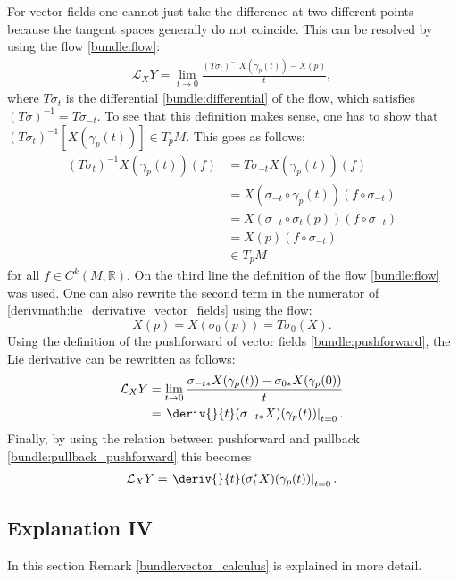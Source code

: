     For vector fields one cannot just take the difference at two different points because the tangent spaces generally do not coincide. This can be resolved by using the flow \ref{bundle:flow}:
    \begin{gather}
        \label{derivmath:lie_derivative_vector_fields}
        \mathcal{L}_XY = \lim_{t\rightarrow0}\frac{(T\sigma_t)^{-1}X(\gamma_p(t)) - X(p)}{t},
    \end{gather}
    where $T\sigma_t$ is the differential \ref{bundle:differential} of the flow, which satisfies $(T\sigma)^{-1} = T\sigma_{-t}$. To see that this definition makes sense, one has to show that $(T\sigma_t)^{-1}[X(\gamma_p(t))]\in T_pM$. This goes as follows:
    \begin{align*}
        (T\sigma_t)^{-1}X(\gamma_p(t))(f) &= T\sigma_{-t}X(\gamma_p(t))(f)\\
        &= X(\sigma_{-t}\circ\gamma_p(t))(f\circ\sigma_{-t})\\
        &= X(\sigma_{-t}\circ\sigma_t(p))(f\circ\sigma_{-t})\\
        &= X(p)(f\circ\sigma_{-t})\\
        &\in T_pM
    \end{align*}
    for all $f\in C^k(M,\mathbb{R})$. On the third line the definition of the flow \ref{bundle:flow} was used. One can also rewrite the second term in the numerator of \eqref{derivmath:lie_derivative_vector_fields} using the flow: \[X(p) = X(\sigma_0(p)) = T\sigma_0(X).\] Using the definition of the pushforward of vector fields \eqref{bundle:pushforward}, the Lie derivative can be rewritten as follows:
    \begin{align*}
        \mathcal{L}_XY &= \lim_{t\rightarrow0}\frac{\sigma_{-t*}X(\gamma_p(t)) - \sigma_{0*}X(\gamma_p(0))}{t}\\
        &= \left.\deriv{}{t}(\sigma_{-t*}X)(\gamma_p(t))\right|_{t=0}.
    \end{align*}
    Finally, by using the relation between pushforward and pullback \eqref{bundle:pullback_pushforward} this becomes
    \begin{gather}
        \mathcal{L}_XY = \left.\deriv{}{t}(\sigma_t^*X)(\gamma_p(t))\right|_{t=0}.
    \end{gather}

\subsection{Explanation IV}

    In this section Remark \ref{bundle:vector_calculus} is explained in more detail.

